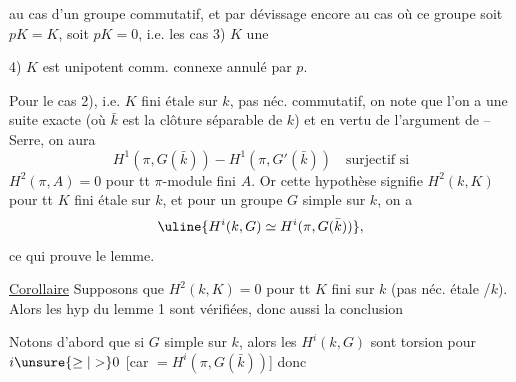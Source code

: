  au cas d'un groupe commutatif,  et par dévissage encore au cas où ce groupe  soit $pK=K$, soit $pK=0$, i.e. les cas 3) $K$ une 

4) $K$ est unipotent comm. connexe annulé par $p$.

Pour le cas 2), i.e. $K$ fini étale sur $k$, pas néc. commutatif, on note que l'on a une suite exacte (où $\bar{k}$ est la clôture  séparable de $k$)
et en vertu de l'argument de --Serre, on aura
\[
H^1(\pi,G(\bar{k}))-H^1(\pi,G'(\bar{k}))\quad\text{surjectif si}
\]
$H^2(\pi,A)=0$ pour tt $\pi$-module fini $A$. Or cette hypothèse signifie $H^2(k,K)$ pour tt $K$ fini étale sur $k$, et pour un groupe $G$ simple sur $k$, on a
\[
\uline{H^i(k,G)\simeq H^i(\pi,G(\bar{k}))},
\]
 ce qui prouve le lemme.

\uline{Corollaire} Supposons que $H^2(k,K)=0$ pour tt $K$ fini sur $k$ (pas néc. étale /$k$). Alors les  hyp du lemme 1 sont vérifiées, donc aussi la conclusion

Notons d'abord que si $G$ simple sur $k$, alors les $H^i(k,G)$ sont torsion pour $i\unsure{\geq|>}0$ [car $=H^i(\pi,G(\bar{k}))$] donc   

